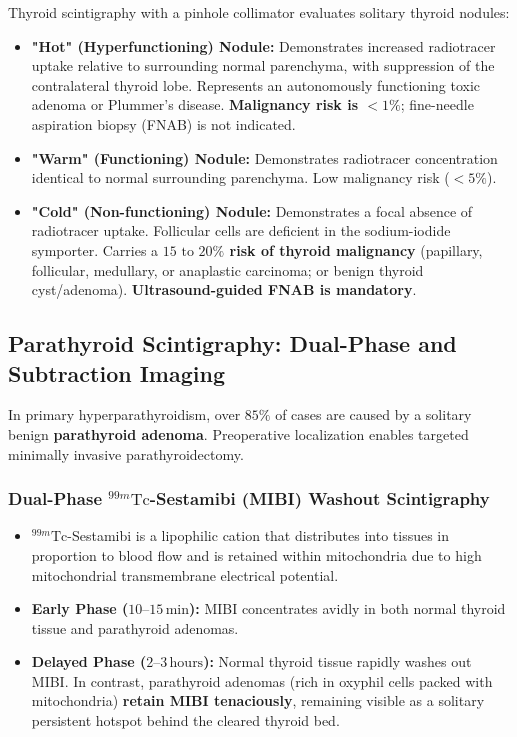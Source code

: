 \documentclass[11pt,a4paper]{article}
\begin{document}
Thyroid scintigraphy with a pinhole collimator evaluates solitary thyroid nodules:
\begin{itemize}[leftmargin=*]
    \item \textbf{"Hot" (Hyperfunctioning) Nodule:} Demonstrates increased radiotracer uptake relative to surrounding normal parenchyma, with suppression of the contralateral thyroid lobe. Represents an autonomously functioning toxic adenoma or Plummer's disease. \textbf{Malignancy risk is $< 1\%$}; fine-needle aspiration biopsy (FNAB) is not indicated.
    \item \textbf{"Warm" (Functioning) Nodule:} Demonstrates radiotracer concentration identical to normal surrounding parenchyma. Low malignancy risk ($< 5\%$).
    \item \textbf{"Cold" (Non-functioning) Nodule:} Demonstrates a focal absence of radiotracer uptake. Follicular cells are deficient in the sodium-iodide symporter. Carries a \textbf{$15\text{ to }20\%$ risk of thyroid malignancy} (papillary, follicular, medullary, or anaplastic carcinoma; or benign thyroid cyst/adenoma). \textbf{Ultrasound-guided FNAB is mandatory}.
\end{itemize}

\subsection{Parathyroid Scintigraphy: Dual-Phase and Subtraction Imaging}

In primary hyperparathyroidism, over $85\%$ of cases are caused by a solitary benign \textbf{parathyroid adenoma}. Preoperative localization enables targeted minimally invasive parathyroidectomy.

\subsubsection{Dual-Phase \texorpdfstring{$^{99m}\text{Tc}$}{99mTc}-Sestamibi (MIBI) Washout Scintigraphy}
\begin{itemize}[leftmargin=*]
    \item $^{99m}\text{Tc}$-Sestamibi is a lipophilic cation that distributes into tissues in proportion to blood flow and is retained within mitochondria due to high mitochondrial transmembrane electrical potential.
    \item \textbf{Early Phase ($10\text{--}15\,\text{min}$):} MIBI concentrates avidly in both normal thyroid tissue and parathyroid adenomas.
    \item \textbf{Delayed Phase ($2\text{--}3\,\text{hours}$):} Normal thyroid tissue rapidly washes out MIBI. In contrast, parathyroid adenomas (rich in oxyphil cells packed with mitochondria) \textbf{retain MIBI tenaciously}, remaining visible as a solitary persistent hotspot behind the cleared thyroid bed.
\end{itemize}
\end{document}
